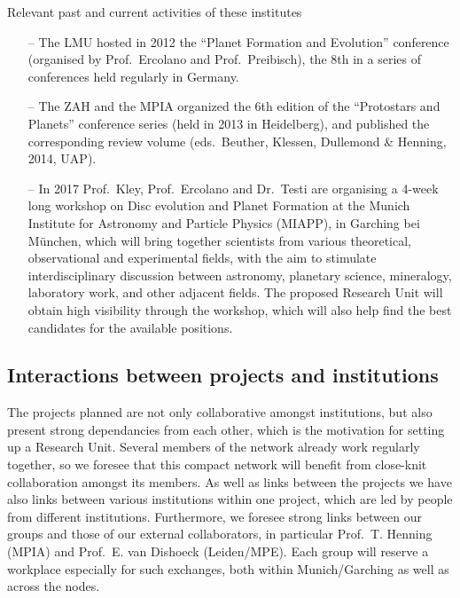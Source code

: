 \documentclass[10pt,fleqn,twoside]{article}
\begin{document}
\begin{Emphasize}
Relevant past and current activities of these institutes
\end{Emphasize}
\begin{itemize}
\item[--] The LMU hosted in 2012 the ``Planet Formation and Evolution''
conference (organised by Prof.~Ercolano and Prof.~Preibisch), the 8th
in a series of conferences held regularly in Germany.
\item[--] The ZAH and the MPIA organized the 6th edition of the
``Protostars and Planets'' conference series (held in 2013 in Heidelberg), 
and published the corresponding review volume (eds.~Beuther,
Klessen, Dullemond \& Henning, 2014, UAP).
\item[--] In 2017
Prof.~Kley, Prof.~Ercolano and Dr.~Testi are organising a 4-week
long workshop on Disc evolution and Planet Formation at the Munich
Institute for Astronomy and Particle Physics (MIAPP), in Garching bei
M\"unchen, which will bring
together scientists from various theoretical, observational and
experimental fields, with the aim to stimulate interdisciplinary
discussion between astronomy, planetary science, mineralogy,
laboratory work, and other adjacent fields. The proposed Research Unit
will obtain high visibility through the workshop, which will also help
find the best candidates for the available positions. 
\end{itemize}


\subsection{Interactions between projects and institutions}
\label{sec-interactions-between-projects}
\noindent The projects planned are not only collaborative amongst institutions,
but also present strong dependancies from each other, which is the
motivation for setting up a Research Unit. Several members of the
network already work regularly together, so we foresee that this compact
network will benefit from close-knit collaboration amongst its members.
As well as links between the projects we have also links between
various institutions within one project, which are led by people from
different institutions. Furthermore, we foresee
strong links between our groups and those of our external
collaborators, in particular Prof.~T. Henning (MPIA) and Prof.~E. van
Dishoeck (Leiden/MPE). Each group will reserve a workplace especially 
for such exchanges, both within Munich/Garching as well as across the nodes. 
\end{document}
